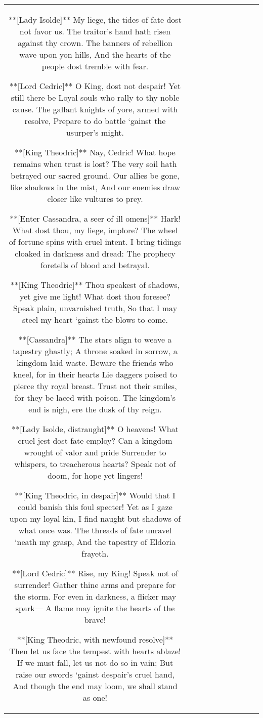 \begin{table}[h!]
\begin{tabular}{|c|c|c|c|c|c|c|c|c|c|}
**[Lady Isolde]**  
My liege, the tides of fate dost not favor us.  
The traitor’s hand hath risen against thy crown.  
The banners of rebellion wave upon yon hills,  
And the hearts of the people dost tremble with fear.

**[Lord Cedric]**  
O King, dost not despair! Yet still there be  
Loyal souls who rally to thy noble cause.  
The gallant knights of yore, armed with resolve,  
Prepare to do battle ‘gainst the usurper’s might.

**[King Theodric]**  
Nay, Cedric! What hope remains when trust is lost?  
The very soil hath betrayed our sacred ground.  
Our allies be gone, like shadows in the mist,  
And our enemies draw closer like vultures to prey.

**[Enter Cassandra, a seer of ill omens]**  
Hark! What dost thou, my liege, implore?  
The wheel of fortune spins with cruel intent.  
I bring tidings cloaked in darkness and dread:  
The prophecy foretells of blood and betrayal.

**[King Theodric]**  
Thou speakest of shadows, yet give me light!  
What dost thou foresee? Speak plain, unvarnished truth,  
So that I may steel my heart ‘gainst the blows to come.

**[Cassandra]**  
The stars align to weave a tapestry ghastly;  
A throne soaked in sorrow, a kingdom laid waste.  
Beware the friends who kneel, for in their hearts  
Lie daggers poised to pierce thy royal breast.  
Trust not their smiles, for they be laced with poison.  
The kingdom’s end is nigh, ere the dusk of thy reign.

**[Lady Isolde, distraught]**  
O heavens! What cruel jest dost fate employ?  
Can a kingdom wrought of valor and pride  
Surrender to whispers, to treacherous hearts?  
Speak not of doom, for hope yet lingers!

**[King Theodric, in despair]**  
Would that I could banish this foul specter!  
Yet as I gaze upon my loyal kin,  
I find naught but shadows of what once was.  
The threads of fate unravel ‘neath my grasp,  
And the tapestry of Eldoria frayeth.

**[Lord Cedric]**  
Rise, my King! Speak not of surrender!  
Gather thine arms and prepare for the storm.  
For even in darkness, a flicker may spark—  
A flame may ignite the hearts of the brave!

**[King Theodric, with newfound resolve]**  
Then let us face the tempest with hearts ablaze!  
If we must fall, let us not do so in vain;  
But raise our swords ‘gainst despair’s cruel hand,  
And though the end may loom, we shall stand as one! 


\end{tabular}
\end{table}
